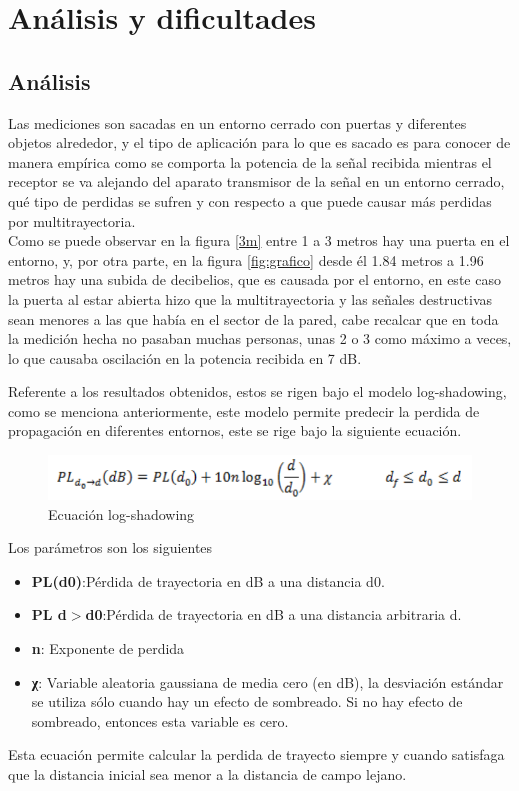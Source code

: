 \section{Análisis y dificultades}
\subsection{Análisis}
Las mediciones son sacadas en un entorno cerrado con puertas y diferentes objetos alrededor, y el tipo de aplicación para lo que es sacado es para conocer de manera empírica como se comporta la potencia de la señal recibida mientras el receptor se va alejando del aparato transmisor de la señal en un entorno cerrado, qué tipo de perdidas se sufren y con respecto a que puede causar más perdidas por multitrayectoria.\\
Como se puede observar en la figura \ref{3m} entre 1 a 3 metros hay una puerta en el entorno, y, por otra parte, en la figura \ref{fig:grafico} desde él 1.84 metros a 1.96 metros hay una subida de decibelios, que es causada por el entorno, en este caso la puerta al estar abierta hizo que la multitrayectoria y las señales destructivas sean menores a las que había en el sector de la pared, cabe recalcar que en toda la medición hecha no pasaban muchas personas, unas 2 o 3 como máximo a veces, lo que causaba oscilación en la potencia recibida en 7 dB.

Referente a los resultados obtenidos, estos se rigen bajo el modelo log-shadowing, como se menciona anteriormente, este modelo permite predecir la perdida de propagación en diferentes entornos, este se rige bajo la siguiente ecuación.

 \begin{figure}[H]
        \centering
        \includegraphics[width=\linewidth]{Imagenes/imagen_2022-11-08_164022665.png}
        \caption{Ecuación log-shadowing}
        \label{log}
  \end{figure}
   Los parámetros son los siguientes
   
  \begin{itemize}
    \item \textbf{PL(d0)}:Pérdida de trayectoria en dB a una distancia d0.
   \item \textbf{PL d$>$d0}:Pérdida de trayectoria en dB a una distancia arbitraria d.
   \item \textbf{n}: Exponente de perdida
    \item \textbf{χ}: Variable aleatoria gaussiana de media cero (en dB), la desviación estándar se utiliza sólo cuando hay un efecto de sombreado. Si no hay efecto de sombreado, entonces esta variable es cero.
   
\end{itemize}
 Esta ecuación permite calcular la perdida de trayecto siempre y cuando satisfaga que la distancia inicial sea menor a la distancia de campo lejano.

